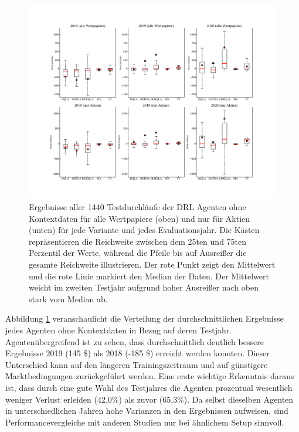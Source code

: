 \begin{figure}[t!]
\center
\includegraphics[scale=0.95]{figures/plot.pdf}
\vspace{0.1mm}
\caption[Ergebnisse der \acs{DRL} Agenten ohne Kontextdaten]{Ergebnisse aller 1440 Testdurchläufe der \acs{DRL} Agenten ohne Kontextdaten für alle Wertpapiere (oben) und nur für Aktien (unten) für jede Variante und jedes Evaluationsjahr. Die Kästen repräsentieren die Reichweite zwischen dem 25ten und 75ten Perzentil der Werte, während die Pfeile bis auf Ausreißer die gesamte Reichweite illustrieren. Der rote Punkt zeigt den Mittelwert und die rote Linie markiert den Median der Daten. Der Mittelwert weicht im zweiten Testjahr aufgrund hoher Ausreißer nach oben stark vom Median ab.}
  \label{fig:boxplot}
\end{figure}

Abbildung \ref{fig:boxplot} veranschaulicht die Verteilung der durchschnittlichen Ergebnisse jedes Agenten ohne Kontextdaten in Bezug auf deren Testjahr.
Agentenübergreifend ist zu sehen, dass durchschnittlich deutlich bessere Ergebnisse 2019 (145 \$) als 2018 (-185 \$) erreicht werden konnten.
Dieser Unterschied kann auf den längeren Trainingszeitraum und auf günstigere Marktbedingungen zurückgeführt werden.
Eine erste wichtige Erkenntnis daraus ist, dass durch eine gute Wahl des Testjahres die Agenten prozentual wesentlich weniger Verlust erleiden (42,0\%) als zuvor (65,3\%). Da selbst dieselben Agenten in unterschiedlichen Jahren hohe Varianzen in den Ergebnissen aufweisen, sind Performancevergleiche mit anderen Studien nur bei ähnlichem Setup sinnvoll.

